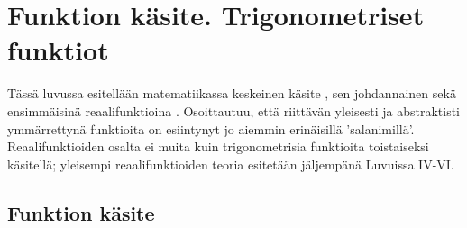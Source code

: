 \section{Funktion käsite. Trigonometriset funktiot} \label{trigonometriset funktiot}
\alku

Tässä luvussa esitellään matematiikassa keskeinen käsite , sen johdannainen
 sekä ensimmäisinä reaalifunktioina .
Osoittautuu, että riittävän yleisesti ja abstraktisti ymmärrettynä  funktioita on esiintynyt
jo aiemmin erinäisillä 'salanimillä'. Reaalifunktioiden osalta ei muita kuin trigonometrisia
funktioita toistaiseksi käsitellä; yleisempi reaalifunktioiden teoria esitetään jäljempänä
Luvuissa IV-VI.

\subsection*{Funktion käsite}

